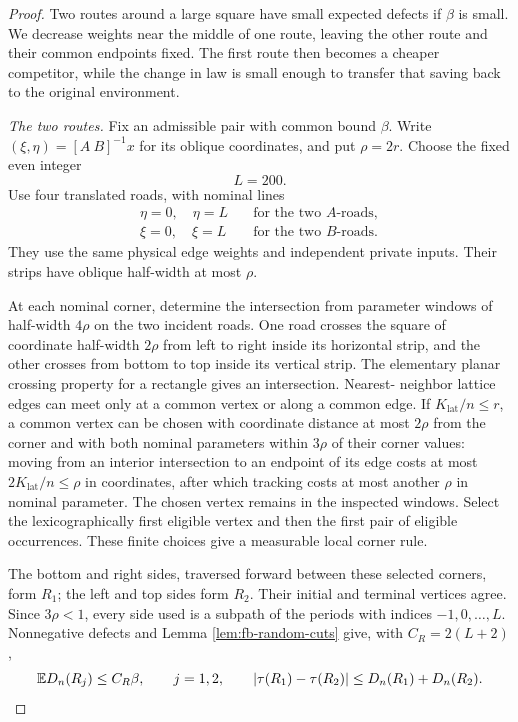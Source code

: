 \begin{proof}
Two routes around a large square have small expected defects if
$\beta$ is small.  We decrease weights near the middle of one route,
leaving the other route and their common endpoints fixed.  The first
route then becomes a cheaper competitor, while the change in law is
small enough to transfer that saving back to the original environment.

\emph{The two routes.}
Fix an admissible pair with common bound $\beta$.  Write
$(\xi,\eta)=[A\ B]^{-1}x$ for its oblique coordinates, and put
$\rho=2r$.  Choose the fixed even integer
\[
 L=200.
\]
Use four translated roads, with nominal lines
\[
 \begin{aligned}
 \eta=0,\quad\eta=L
 &\quad\text{for the two $A$-roads},\\
 \xi=0,\quad\xi=L
 &\quad\text{for the two $B$-roads}.
 \end{aligned}
\]
They use the same physical edge weights and independent private
inputs.  Their strips have oblique half-width at most $\rho$.

At each nominal corner, determine the intersection from parameter
windows of half-width $4\rho$ on the two incident roads.  One
road crosses the square of coordinate half-width $2\rho$ from left
to right inside its horizontal strip, and the other crosses from
bottom to top inside its vertical strip.  The elementary planar
crossing property for a rectangle gives an intersection.  Nearest-
neighbor lattice edges can meet only at a common vertex or along a
common edge.  If $K_{\mathrm{lat}}/n\le r$, a common vertex can be chosen with
coordinate distance at most $2\rho$ from the corner and with both
nominal parameters within $3\rho$ of their corner values: moving
from an interior intersection to an endpoint of its edge costs at
most $2K_{\mathrm{lat}}/n\le\rho$ in coordinates, after which tracking costs at
most another $\rho$ in nominal parameter.  The chosen vertex remains
in the inspected windows.  Select the lexicographically first eligible vertex
and then the first pair of eligible occurrences.  These finite choices
give a measurable local corner rule.

The bottom and right sides, traversed forward between these selected
corners, form $R_1$; the left and top sides form $R_2$.  Their initial
and terminal vertices agree.  Since $3\rho<1$, every side used is a
subpath of the periods with indices $-1,0,\ldots,L$.  Nonnegative
defects and Lemma \ref{lem:fb-random-cuts} give, with
$C_R=2(L+2)$,
\begin{equation}
 \mathbb E D_n(R_j)\le C_R\beta,\qquad j=1,2,
 \qquad
 |\tau(R_1)-\tau(R_2)|\le D_n(R_1)+D_n(R_2).
 \label{eq:fb-route-defects}
\end{equation}


\end{proof}
